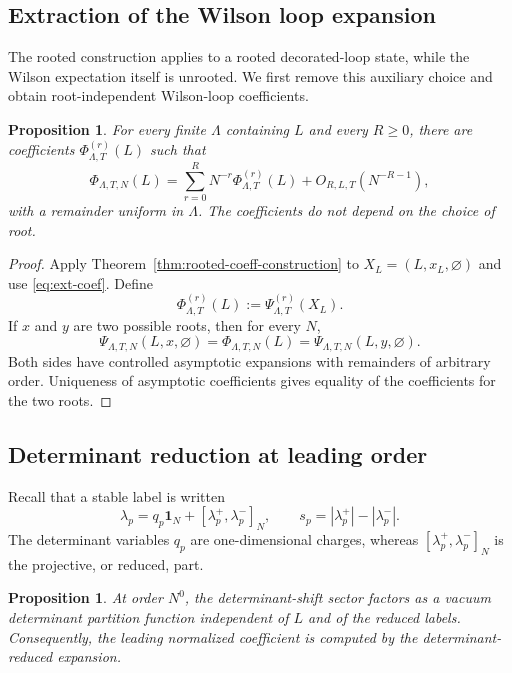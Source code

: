 \documentclass[11pt,a4paper,reqno]{amsart}
\newtheorem{proposition}[theorem]{Proposition}
\theoremstyle{definition}
\theoremstyle{remark}
\begin{document}
\subsection{Extraction of the Wilson loop expansion}

The rooted construction applies to a rooted decorated-loop state, while the Wilson expectation itself is unrooted.  We first remove this auxiliary choice and obtain root-independent Wilson-loop coefficients.

\begin{proposition}\label{prop:wilson-expansion-from-rooted}
For every finite $\Lambda$ containing $L$ and every $R\ge0$, there are coefficients $\Phi^{(r)}_{\Lambda,T}(L)$ such that
\begin{equation}\label{eq:expansion-phi}
\Phi_{\Lambda,T,N}(L)
=
\sum_{r=0}^R N^{-r}\Phi^{(r)}_{\Lambda,T}(L)
+
O_{R,L,T}(N^{-R-1}),
\end{equation}
with a remainder uniform in $\Lambda$.  The coefficients do not depend on the choice of root.
\end{proposition}

\begin{proof}
Apply Theorem~\ref{thm:rooted-coeff-construction} to $X_L=(L,x_L,\varnothing)$ and use \eqref{eq:ext-coef}.  Define
\[
\Phi^{(r)}_{\Lambda,T}(L):=\Psi^{(r)}_{\Lambda,T}(X_L).
\]
If $x$ and $y$ are two possible roots, then for every $N$,
\[
\Psi_{\Lambda,T,N}(L,x,\varnothing)=\Phi_{\Lambda,T,N}(L)=
\Psi_{\Lambda,T,N}(L,y,\varnothing).
\]
Both sides have controlled asymptotic expansions with remainders of arbitrary order.  Uniqueness of asymptotic coefficients gives equality of the coefficients for the two roots.
\end{proof}

\subsection{Determinant reduction at leading order}

Recall that a stable label is written
\[
\lambda_p=q_p\mathbf 1_N+[\lambda_p^+,\lambda_p^-]_N,
\qquad
s_p=|\lambda_p^+|-|\lambda_p^-|.
\]
The determinant variables $q_p$ are one-dimensional charges, whereas $[\lambda_p^+,\lambda_p^-]_N$ is the projective, or reduced, part.


\begin{proposition}\label{prop:determinant-reduction-leading}
At order $N^0$, the determinant-shift sector factors as a vacuum determinant partition function independent of $L$ and of the reduced labels. Consequently, the leading normalized coefficient is computed by the determinant-reduced expansion.
\end{proposition}
\end{document}
